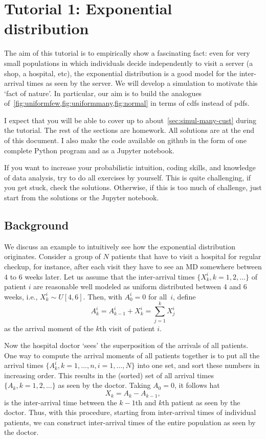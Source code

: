 \section{Tutorial 1: Exponential distribution}

The aim of this tutorial is to empirically show a fascinating fact: even for very small populations in which individuals decide independently to visit a server (a shop, a hospital, etc), the exponential distribution is a good model for the inter-arrival times as seen by the server.
We will develop a simulation to motivate this `fact of nature'.
In particular, our aim is to build the analogues of~\cref{fig:uniformfew,fig:uniformmany,fig:normal}  in terms of cdfs instead of pdfs.

I expect that you will be able to cover up to about~\cref{sec:simul-many-cust} during the tutorial.
The rest of the sections are homework.
All solutions are at the end of this document.
I also make the code available on github in the form of one complete Python program and as a Jupyter notebook.

If you want to increase your probabilistic intuition, coding skills, and knowledge of data analysis, try to do all exercises by yourself.
This is quite challenging, if you get stuck, check the solutions.
Otherwise, if this is too much of challenge, just start from the solutions or the Jupyter notebook.

\subsection{Background}

We discuss an example to intuitively see how the exponential distribution originates.
Consider a group of $N$ patients that have to visit a hospital for regular checkup, for instance, after each visit they have to see an MD somewhere between  $4$ to $6$ weeks later.
Let us  assume that the inter-arrival times $\{X_k^i, k=1,2, \ldots\}$ of patient $i$ are reasonable well modeled as  uniform distributed between $4$ and $6$ weeks, i.e.,  $X_k^i \sim U[4, 6]$.
Then, with $A_{0}^i=0$ for all~$i$, define
\begin{equation}\label{eq:A_kk}
A_k^i = A_{k-1}^i + X_k^i = \sum_{j=1}^k X_j^i
\end{equation}
as the arrival moment of the $k$th visit of patient $i$.

Now the hospital doctor `sees' the superposition of the arrivals of all patients.
One way to compute the arrival moments of all patients together is to put all the arrival times $\{A_k^i, k=1,\ldots,n, i=1,\ldots,N\}$ into one set, and sort these numbers in increasing order.
This results in the (sorted) set of all arrival times $\{A_k, k=1,2,\ldots\}$ as seen by the doctor.
Taking $A_0=0$, it follows hat
\begin{equation}\label{eq:X_kk}
X_k = A_k - A_{k-1},
\end{equation}
is the inter-arrival time between the $k-1$th and $k$th patient as seen by the doctor.
Thus, with this procedure, starting from inter-arrival times of individual patients, we can construct inter-arrival times of the entire population as seen by the doctor.


